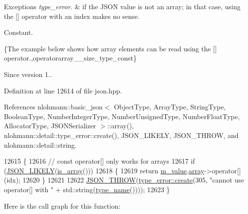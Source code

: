 \begin{DoxyExceptions}{Exceptions}
{\em type\+\_\+error.} & if the J\+S\+ON value is not an array; in that case, using the \mbox{[}\mbox{]} operator with an index makes no sense.\\
\hline
\end{DoxyExceptions}
Constant.

\{The example below shows how array elements can be read using the {\ttfamily \mbox{[}\mbox{]}} operator.,operatorarray\+\_\+\+\_\+size\+\_\+type\+\_\+const\}

\begin{DoxySince}{Since}
version 1.. 
\end{DoxySince}


Definition at line 12614 of file json.\+hpp.



References nlohmann\+::basic\+\_\+json$<$ Object\+Type, Array\+Type, String\+Type, Boolean\+Type, Number\+Integer\+Type, Number\+Unsigned\+Type, Number\+Float\+Type, Allocator\+Type, J\+S\+O\+N\+Serializer $>$\+::array(), nlohmann\+::detail\+::type\+\_\+error\+::create(), J\+S\+O\+N\+\_\+\+L\+I\+K\+E\+LY, J\+S\+O\+N\+\_\+\+T\+H\+R\+OW, and nlohmann\+::detail\+::string.


\begin{DoxyCode}
12615     \{
12616         \textcolor{comment}{// const operator[] only works for arrays}
12617         \textcolor{keywordflow}{if} (\hyperlink{json_8hpp_a41ecd1c4cf7c3d56477b9b685b5daa72}{JSON\_LIKELY}(\hyperlink{classnlohmann_1_1basic__json_aef9ce5dd2381caee1f8ddcdb5bdd9c65}{is\_array}()))
12618         \{
12619             \textcolor{keywordflow}{return} \hyperlink{classnlohmann_1_1basic__json_aeb0814f76966f99290cb29e127c90a77}{m\_value}.\hyperlink{unionnlohmann_1_1basic__json_1_1json__value_a7947687f3ae1911d6e9847e2b3226157}{array}->operator[](idx);
12620         \}
12621 
12622         \hyperlink{json_8hpp_a6c274f6db2e65c1b66c7d41b06ad690f}{JSON\_THROW}(\hyperlink{classnlohmann_1_1detail_1_1type__error_aecc083aea4b698c33d042670ba50c10f}{type\_error::create}(305, \textcolor{stringliteral}{"cannot use operator[] with "} + 
      std::string(\hyperlink{classnlohmann_1_1basic__json_a9d0a478571f82f0163b96b2424cd998f}{type\_name}())));
12623     \}
\end{DoxyCode}
Here is the call graph for this function\+:
\mbox{\label{classnlohmann_1_1basic__json_a233b02b0839ef798942dd46157cc0fe6}} 
